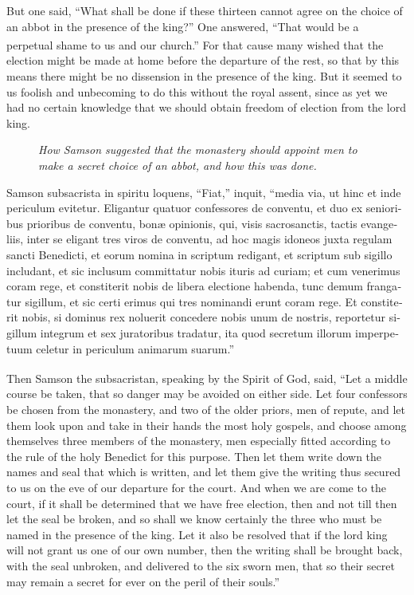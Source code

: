 \documentclass{book}
\newcounter{engnote}
\newcommand{\engnotenum}{\textsuperscript{\arabic{engnote}\stepcounter{engnote}}}
\newcommand{\engnotetext}[1]{\vphantom{\footnotemark{}}\footnotetext{#1}}
\newcommand{\blockhead}[4][]{
\begin{figure}
\centering
\vspace{#4}
\parbox{2.75cm}{\begin{center}\footnotesize \color{BrickRed} \emph{#2}\\ #1 \end{center}}
\end{figure}
}
\begin{document}
\begin{paracol}{2}
\switchcolumn

But one said, ``What shall be done if these thirteen cannot agree on the choice of an abbot in the presence of the king?'' One answered, ``That would be a perpetual shame\engnotenum{} to us and our church.'' For that cause many wished that the election might be made at home before the departure of the rest, so that by this means there might be no dissension in the presence of the king. But it seemed to us foolish and unbecoming to do this without the royal assent, since as yet we had no certain knowledge that we should obtain freedom of election from the lord king.

\switchcolumn*

\begin{otherlanguage}{latin}
\blockhead{How Samson suggested that the monastery should appoint men to make a secret choice of an abbot, and how this was done.}{5}{-0.6cm}
Samson subsacrista in spiritu\engnotetext{I.\ Cor.\ xii., \oldstylenums{3}.} loquens, ``Fiat,'' inquit, ``media via, ut hinc et inde periculum evitetur. Eligantur quatuor confessores de conventu, et duo ex senioribus prioribus de conventu, bon\ae{} opinionis, qui, visis sacrosanctis, tactis evangeliis, inter se eligant tres viros de conventu, ad hoc magis idoneos juxta regulam sancti Benedicti, et eorum nomina in scriptum redigant, et scriptum sub sigillo includant, et sic inclusum committatur nobis ituris ad curiam; et cum venerimus coram rege, et constiterit nobis de libera electione habenda, tunc demum frangatur sigillum, et sic certi erimus qui tres nominandi erunt coram rege. Et constiterit nobis, si dominus rex noluerit concedere nobis unum de nostris, reportetur sigillum integrum et sex juratoribus tradatur, ita quod secretum illorum imperpetuum celetur in periculum animarum suarum.''

\end{otherlanguage}

\switchcolumn

Then Samson the subsacristan, speaking by the Spirit of God,\engnotenum{} said, ``Let a middle course be taken, that so danger may be avoided on either side. Let four confessors be chosen from the monastery, and two of the older priors, men of repute, and let them look upon and take in their hands the most holy gospels, and choose among themselves three members of the monastery, men especially fitted according to the rule of the holy Benedict for this purpose. Then let them write down the names and seal that which is written, and let them give the writing thus secured to us on the eve of our departure for the court. And when we are come to the court, if it shall be determined that we have free election, then and not till then let the seal be broken, and so shall we know certainly the three who must be named in the presence of the king. Let it also be resolved that if the lord king will not grant us one of our own number, then the writing shall be brought back, with the seal unbroken, and delivered to the six sworn men, that so their secret may remain a secret for ever on the peril of their souls.''


\end{paracol}
\end{document}
